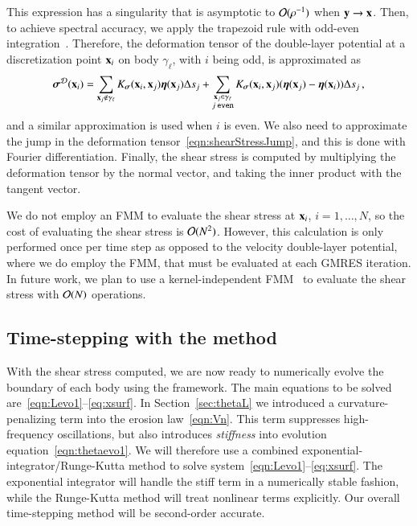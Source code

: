 \documentclass[preprint, 10pt]{elsarticle}
\begin{document}
This expression has a singularity that is asymptotic to
${\mathcal{O}}(\rho^{-1})$ when ${\mathbf{y}} \rightarrow {\mathbf{x}}$.  Then, to achieve
spectral accuracy, we apply the trapezoid rule with odd-even
integration~\cite{sid-isr1988}.  Therefore, the deformation tensor of
the double-layer potential at a discretization point ${\mathbf{x}}_i$ on body
$\gamma_\ell$, with $i$ being odd, is approximated as
\begin{align}
  {\boldsymbol\sigma}^{{\mathcal{D}}}({\mathbf{x}}_i) = \sum_{{\mathbf{x}}_j \notin \gamma_\ell}
    K_{\boldsymbol\sigma}({\mathbf{x}}_i,{\mathbf{x}}_j) {\boldsymbol\eta}({\mathbf{x}}_j) \Delta s_j + 
  \sum_{\substack{{\mathbf{x}}_j \in \gamma_\ell \\ j \: \mathtt{even}}}
    K_{\boldsymbol\sigma}({\mathbf{x}}_i,{\mathbf{x}}_j) ({\boldsymbol\eta}({\mathbf{x}}_j) - {\boldsymbol\eta}({\mathbf{x}}_i)) \Delta s_j \, ,
  \label{eqn:stressOddEven}
\end{align}
and a similar approximation is used when $i$ is even.  We also need to
approximate the jump in the deformation
tensor~\eqref{eqn:shearStressJump}, and this is done with Fourier
differentiation.  Finally, the shear stress is computed by multiplying
the deformation tensor by the normal vector, and taking the inner
product with the tangent vector.

We do not employ an FMM to evaluate the shear stress at ${\mathbf{x}}_i$,
$i=1,\ldots,N$, so the cost of evaluating the shear stress is
${\mathcal{O}}(N^2)$.  However, this calculation is only performed once per time
step as opposed to the velocity double-layer potential, where we do
employ the FMM, that must be evaluated at each GMRES iteration.  In
future work, we plan to use a kernel-independent
FMM~\cite{yin-bir-zor2004} to evaluate the shear stress with ${\mathcal{O}}(N)$
operations.

\subsection{Time-stepping with the {\thL} method} 
\label{sec:timeStepping}

With the shear stress computed, we are now ready to numerically evolve the boundary of each body using the {\thL} framework. The main equations to be solved are~\eqref{eqn:Levo1}--\eqref{eq:xsurf}.  In Section~\ref{sec:thetaL} we introduced a curvature-penalizing term into the erosion law~\eqref{eqn:Vn}. This term suppresses high-frequency oscillations, but also introduces {\em stiffness} into evolution equation~\eqref{eqn:thetaevo1}. We will therefore use a combined exponential-integrator/Runge-Kutta method to solve system~\eqref{eqn:Levo1}--\eqref{eq:xsurf}. The exponential integrator will handle the stiff term in a numerically stable fashion, while the Runge-Kutta method will treat nonlinear terms explicitly. Our overall time-stepping method will be second-order accurate.
\end{document}
